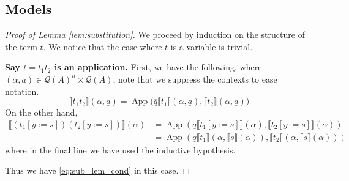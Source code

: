 \documentclass[12pt]{article}
\theoremstyle{plain}
\theoremstyle{definition}
\newcommand{\call}[1]{\mathcal{#1}}
\newcommand{\Qcal}{\call{Q}}
\begin{document}
\subsection{Models}
\begin{proof}[Proof of Lemma \ref{lem:substitution}]
		We proceed by induction on the structure of the term $t$. We notice that the case where $t$ is a variable is trivial.
		
		\textbf{Say $t = t_1t_2$ is an application.} First, we have the following, where $(\alpha, \underline{a}) \in \Qcal(A)^n \times \Qcal(A)$, note that we suppress the contexts to ease notation.
		\begin{equation}
			\llbracket t_1 t_2 \rrbracket(\alpha, \underline{a}) = \operatorname{App}\big(\overline{q}\llbracket t_1 \rrbracket(\alpha, \underline{a}), \llbracket t_2 \rrbracket(\alpha, \underline{a})\big)
			\end{equation}
		On the other hand,
		\begin{align*}
			\llbracket (t_1[y:=s])(t_2[y:=s]) \rrbracket(\alpha) &= \operatorname{App}(\overline{q}\llbracket t_1[y:=s]\rrbracket(\alpha), \llbracket t_2[y:=s]\rrbracket(\alpha))\\
			&= \operatorname{App}(\overline{q}\llbracket t_1 \rrbracket(\alpha, \llbracket s \rrbracket(\alpha)), \llbracket t_2 \rrbracket(\alpha, \llbracket s \rrbracket(\alpha)))
			\end{align*}
		where in the final line we have used the inductive hypothesis.
		
		Thus we have \eqref{eq:sub_lem_cond} in this case.
		

\end{proof}
\end{document}
